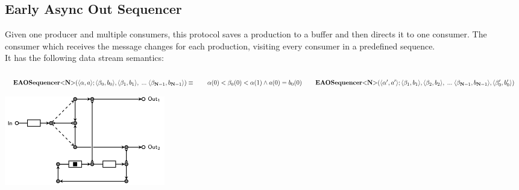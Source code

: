 \subsection{Early Async Out Sequencer}
\begin{minipage}{.65\textwidth}
  Given one producer and multiple consumers, this protocol saves a production to a buffer and then directs it to one consumer. The consumer which receives the message changes for each production, visiting every consumer in a predefined sequence.\\
  It has the following data stream semantics:\\\\
  $
  \vspace{0.2cm}\eaoseq (\langle \alpha, a \rangle;\langle \beta_0, b_0 \rangle, \langle \beta_1, b_1 \rangle,\;...\; \langle \beta_{\textbf{N}-1}, b_{\textbf{N}-1} \rangle) \equiv \\
  \vspace{0.2cm} \hphantom \qquad \alpha(0) < \beta_0(0) < \alpha(1) \land a(0) = b_0(0) \\
  \vspace{0.2cm} \hphantom \qquad \eaoseq (\langle \alpha', a' \rangle; \langle \beta_1, b_1 \rangle,\langle \beta_2, b_2 \rangle,\;...\; \langle \beta_{\textbf{N}-1}, b_{\textbf{N}-1} \rangle, \langle \beta_0', b_0' \rangle)
  $
\end{minipage}\hspace{0.05cm}
\begin{minipage}{.25\textwidth}
  \includegraphics[width=7cm]{img/eaoseq.png}\\
\end{minipage}
